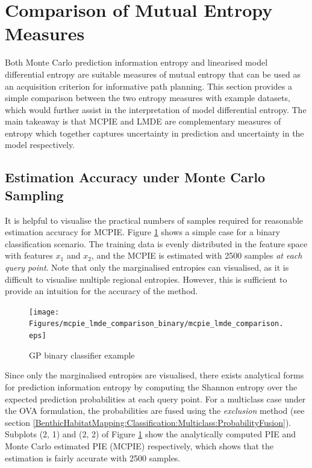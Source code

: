 	\section{Comparison of Mutual Entropy Measures}
	\label{InformativeSeafloorExploration:ComparisonMutualEntropyMeasures}
	
		Both Monte Carlo prediction information entropy and linearised model differential entropy are suitable measures of mutual entropy that can be used as an acquisition criterion for informative path planning. This section provides a simple comparison between the two entropy measures with example datasets, which would further assist in the interpretation of model differential entropy. The main takeaway is that MCPIE and LMDE are complementary measures of entropy which together captures uncertainty in prediction and uncertainty in the model respectively.
	
		\subsection{Estimation Accuracy under Monte Carlo Sampling}
		\label{InformativeSeafloorExploration:ComparisonMutualEntropyMeasures:EstimationAccuracy}
		
			It is helpful to visualise the practical numbers of samples required for reasonable estimation accuracy for MCPIE. Figure \ref{Figure:mcpie_lmde_comparison_binary} shows a simple case for a binary classification scenario. The training data is evenly distributed in the feature space with features $x_{1}$ and $x_{2}$, and the MCPIE is estimated with 2500 samples \textit{at each query point}. Note that only the marginalised entropies can visualised, as it is difficult to visualise multiple regional entropies. However, this is sufficient to provide an intuition for the accuracy of the method.
			
			\begin{figure}[!htbp]
				\centering
					\texttt{[image: Figures/mcpie\_lmde\_comparison\_binary/mcpie\_lmde\_comparison.eps]}
				\caption{GP binary classifier example}
				\label{Figure:mcpie_lmde_comparison_binary}
			\end{figure}			
					
			Since only the marginalised entropies are visualised, there exists analytical forms for prediction information entropy by computing the Shannon entropy over the expected prediction probabilities at each query point. For a multiclass case under the OVA formulation, the probabilities are fused using the \textit{exclusion} method (see section  \ref{BenthicHabitatMapping:Classification:Multiclass:ProbabilityFusion}). Subplots (2, 1) and (2, 2) of Figure \ref{Figure:mcpie_lmde_comparison_binary} show the analytically computed PIE and Monte Carlo estimated PIE (MCPIE) respectively, which shows that the estimation is fairly accurate with 2500 samples.
			
